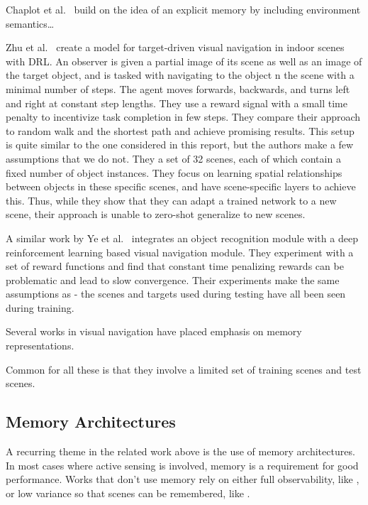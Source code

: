 Chaplot et al.~\cite{chaplot_semantic_2020} build on the idea of an explicit memory by including environment semantics\dots

Zhu et al.~\cite{zhu_target_driven_2016} create a model for target-driven visual navigation in indoor scenes with DRL.
An observer is given a partial image of its scene as well as an image of the target object, and is tasked with navigating to the object n the scene with a minimal number of steps.
The agent moves forwards, backwards, and turns left and right at constant step lengths.
They use a reward signal with a small time penalty to incentivize task completion in few steps.
They compare their approach to random walk and the shortest path and achieve promising results.
This setup is quite similar to the one considered in this report, but the authors make a few assumptions that we do not.
They a set of 32 scenes, each of which contain a fixed number of object instances.
They focus on learning spatial relationships between objects in these specific scenes, and have scene-specific layers to achieve this.
Thus, while they show that they can adapt a trained network to a new scene, their approach is unable to zero-shot generalize to new scenes.

A similar work by Ye et al.~\cite{ye_active_2018} integrates an object recognition module with a deep reinforcement learning based visual navigation module.
They experiment with a set of reward functions and find that constant time penalizing rewards can be problematic and lead to slow convergence.
Their experiments make the same assumptions as \cite{zhu_target_driven} - the scenes and targets used during testing have all been seen during training.

Several works in visual navigation have placed emphasis on memory representations.~\cite{savinov_topmem_2018,oh_minecraft_2016,parisotto_salakhutdinov_2017,chen_memory_2017} %


%
%

Common for all these is that they involve a limited set of training scenes and test scenes.


\subsection{Memory Architectures}

A recurring theme in the related work above is the use of memory architectures.
In most cases where active sensing is involved, memory is a requirement for good performance.
Works that don't use memory rely on either full observability, like \cite{caicedo_active_2015}, or low variance so that scenes can be remembered, like \cite{ghesu_artificial_2016}.

